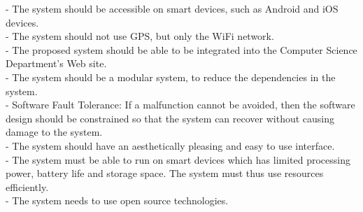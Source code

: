 
- The system should be accessible on smart devices, such as Android and iOS devices.\\
- The system should not use GPS, but only the WiFi network. \\
- The proposed system should be able to be integrated into the Computer Science Department's Web site. \\
- The system should be a modular system, to reduce the dependencies in the system. \\
- Software Fault Tolerance: If a malfunction cannot be avoided, then the software design should be constrained so that the system can recover without causing damage to the system. \\
- The system should have an aesthetically pleasing and easy to use interface. \\
- The system must be able to run on smart devices which has limited processing power, battery life and storage space. The system must thus use resources efficiently. \\
- The system needs to use open source technologies. \\

